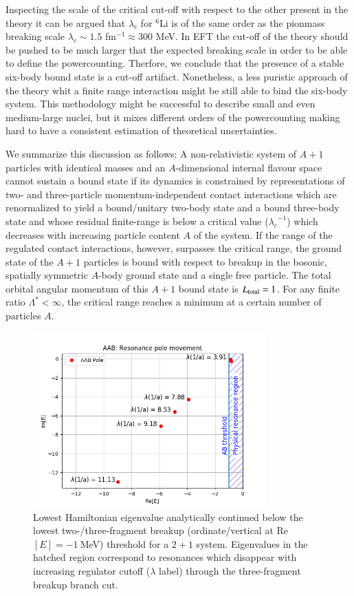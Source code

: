 \documentclass[preprint,12pt]{elsarticle}
\newcommand{\lc}{\ensuremath{\lambda_c}}
\begin{document}
Inspecting the scale of the critical cut-off with respect to the other present in the theory it can be argued that $\lc$ for $^6$Li is of the same order  as the pionmass breaking scale $\lc\sim1.5$ fm$^{-1} \approx300$ MeV.
In EFT the cut-off of the theory should be pushed to be much larger that the expected breaking scale in order to be able to define the powercounting.
Therfore, we conclude that the presence of a stable six-body bound state is a cut-off artifact.
Nonetheless, a less puristic approach of the theory whit a finite range interaction might be still able to bind the six-body system. 
This methodology might be successful to describe small and even medium-large nuclei, but it mixes different orders of the powercounting making hard to have a consistent estimation of theoretical uncertainties.


We summarize this discussion as follows:
A non-relativistic system of $A+1$ particles with identical masses and
an $A$-dimensional internal flavour space cannot sustain a bound state if
its dynamics is constrained by representations of two- and three-particle
momentum-independent contact interactions which are renormalized to yield
a bound/unitary two-body state and a bound three-body state and whose
residual finite-range is below a critical value ($\lc^{−1}$)
which decreases with increasing particle content $A$ of the system.
If the range of the regulated contact interactions, however, surpasses the
critical range, the ground state of the $A+1$ particles is bound with respect
to breakup in the bosonic, spatially symmetric $A$-body ground state and a
single free particle. The total orbital angular momentum of this $A+1$ bound
state is $L_{\text{\scriptsize total}}= 1$.
For any finite ratio $\Lambda^*<\infty$,
the critical range reaches a minimum at a certain number of particles $A$.

\begin{figure}[h] 
\centering 
\includegraphics[width=0.8\textwidth]{./AAB_resonance_run.png} 
\caption{Lowest Hamiltonian eigenvalue analytically continued below the lowest
two-/three-fragment breakup (ordinate/vertical at Re$[E]=-1~$MeV) threshold
for a $2+1$ system. Eigenvalues in the hatched region correspond to resonances
which disappear with increasing regulator cutoff ($\lambda$ label) through the
three-fragment breakup branch cut.}
\label{fig:poletrajectory}
\end{figure}
\end{document}
